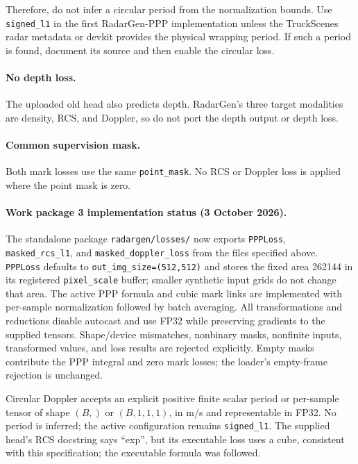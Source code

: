 \documentclass[11pt,a4paper]{article}
\begin{document}
Therefore, do not infer a circular period from the normalization bounds. Use \texttt{signed\_l1} in the first RadarGen-PPP implementation unless the TruckScenes radar metadata or devkit provides the physical wrapping period. If such a period is found, document its source and then enable the circular loss.

\paragraph{No depth loss.}
The uploaded old head also predicts depth. RadarGen's three target modalities are density, RCS, and Doppler, so do not port the depth output or depth loss.

\paragraph{Common supervision mask.}
Both mark losses use the same \texttt{point\_mask}. No RCS or Doppler loss is applied where the point mask is zero.

\paragraph{Work package 3 implementation status (3 October 2026).}
The standalone package \texttt{radargen/losses/} now exports
\texttt{PPPLoss}, \texttt{masked\_rcs\_l1}, and
\texttt{masked\_doppler\_loss} from the files specified above.
\texttt{PPPLoss} defaults to \texttt{out\_img\_size=(512,512)} and stores
the fixed area 262144 in its registered \texttt{pixel\_scale} buffer;
smaller synthetic input grids do not change that area. The active PPP
formula and cubic mark links are implemented with per-sample normalization
followed by batch averaging. All transformations and reductions disable
autocast and use FP32 while preserving gradients to the supplied tensors.
Shape/device mismatches, nonbinary masks, nonfinite inputs, transformed
values, and loss results are rejected explicitly. Empty masks contribute
the PPP integral and zero mark losses; the loader's empty-frame rejection
is unchanged.

Circular Doppler accepts an explicit positive finite scalar period or
per-sample tensor of shape \((B,)\) or \((B,1,1,1)\), in m/s and
representable in FP32. No period is inferred; the active configuration
remains \texttt{signed\_l1}. The supplied head's RCS docstring says
``exp'', but its executable loss uses a cube, consistent with this
specification; the executable formula was followed.
\end{document}
